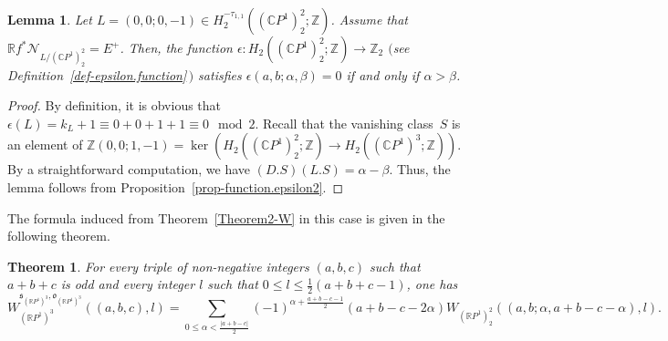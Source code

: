 \documentclass[11pt]{amsart}
\numberwithin{equation}{section}
\theoremstyle{definition}
\theoremstyle{plain}
\newtheorem{theorem}[definition]{Theorem}
\newtheorem{lemma}[definition]{Lemma}
\theoremstyle{remark}
\newcommand{\R}{\mathbb{R}}
\newcommand{\Z}{\mathbb{Z}}
\newcommand{\C}{\mathbb{C}}
\begin{document}
\begin{lemma} \label{lemma2}
Let $L= (0,0;0,-1)\in H_2^{-\tau_{1,1}}( (\C P^1)^2_2;\Z)$. Assume that $\R f^*\mathcal{N}_{L/(\C P^1)^2_2}=E^+$. Then, the function $\epsilon\colon  H_2((\C P^1)^2_2;\Z)\to \Z_2$ $($see Definition~\ref{def-epsilon.function}\,$)$ satisfies $\epsilon(a,b;\alpha,\beta)=0$ if and only if $\alpha > \beta$.
\end{lemma}


\begin{proof}
  By definition, it is obvious that $\epsilon(L)=k_L+1 \equiv 0+0+1+1\equiv 0 \mod 2$. Recall that the vanishing class~$S$ is an element of  $\Z(0,0;1,-1)=\ker(H_2((\C P^1)_2^2;\Z)\to H_2((\C P^1)^3;\Z))$. By a straightforward computation, we have $(D.S)(L.S) = \alpha - \beta.$
Thus, the lemma follows from Proposition~\ref{prop-function.epsilon2}.
\end{proof}

The formula induced from Theorem~\ref{Theorem2-W} in this case is given in the following theorem.

 \begin{theorem} \label{Theorem-W.in.deg.6.1}
For every triple of non-negative integers $(a,b,c)$ such that $a+b+c$ is odd and every integer $l$ such that $0\leq l \leq \tfrac{1}{2}( a+b+c-1)$, one has
\begin{equation} \label{Eq:W.in.deg.6.1}
    W_{(\R P^1)^3}^{\mathfrak{s}_{(\R P^1)^3},\mathfrak{o}_{(\R P^1)^3}}((a,b,c),l)
    =\sum_{0\leq\alpha<\frac{|a+b-c|}{2}}(-1)^{ \alpha +\frac{a+b-c-1}{2}} (a+b-c-2\alpha) W_{(\R P^1)^2_2} ((a,b;\alpha,a+b-c-\alpha),l). 
\end{equation}
\end{theorem}
\end{document}
